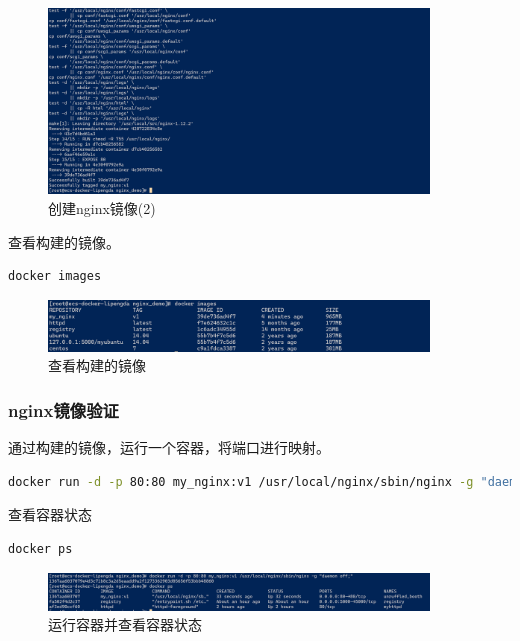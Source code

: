\documentclass{article}
\begin{document}
\begin{figure}[H]
\centering
\includegraphics[width=0.9\textwidth]{img/2.7.1.3.2.png}
\caption{创建nginx镜像(2)}
\end{figure}

查看构建的镜像。

\begin{lstlisting}[language=bash]
    docker images
\end{lstlisting}

\begin{figure}[H]
\centering
\includegraphics[width=0.9\textwidth]{img/2.7.1.4.png}
\caption{查看构建的镜像}
\end{figure}

\subsubsection{nginx镜像验证}

通过构建的镜像，运行一个容器，将端口进行映射。

\begin{lstlisting}[language=bash]
    docker run -d -p 80:80 my_nginx:v1 /usr/local/nginx/sbin/nginx -g "daemon off;"
\end{lstlisting}

查看容器状态

\begin{lstlisting}[language=bash]
    docker ps
\end{lstlisting}

\begin{figure}[H]
\centering
\includegraphics[width=0.9\textwidth]{img/2.7.2.1.png}
\caption{运行容器并查看容器状态}
\end{figure}
\end{document}
